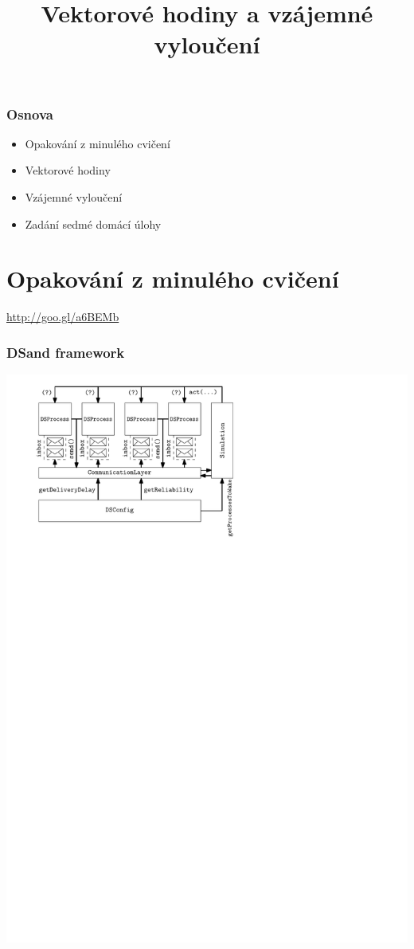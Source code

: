 \documentclass[usenames,dvipsnames,9pt]{beamer}
\title{Vektorové hodiny a vzájemné vyloučení}
\date{}
\institute{B4B36PDV -- Paralelní a distribuované výpočty}
\begin{document}
\maketitle

\begin{frame}
  \frametitle{Osnova}
  \begin{itemize}
    \item Opakování z minulého cvičení\\[1.5em]
    \item Vektorové hodiny
    \item Vzájemné vyloučení\\[1.5em]
    \item Zadání sedmé domácí úlohy
  \end{itemize}
\end{frame}


\section{Opakování z minulého cvičení}

\begin{frame}[standout]
 \vspace{3em}

 \Huge
 \url{http://goo.gl/a6BEMb}
\end{frame}

\begin{frame}
\frametitle{DSand framework}
\centering\includegraphics[width=0.8\linewidth]{11/figs/dsand.pdf}
\end{frame}
\end{document}
